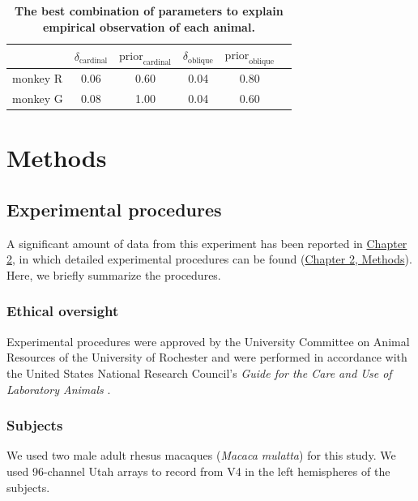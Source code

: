 \documentclass[lineno,pdflatex,sn-basic]{sn-jnl}%
\theoremstyle{thmstyleone}%
\theoremstyle{thmstyletwo}%
\theoremstyle{thmstylethree}%
\begin{document}
\begin{table}[h!]
    \centering
    \caption[The best combination of parameters to explain empirical observation of each animal.]{\textbf{The best combination of parameters to explain empirical observation of each animal.}}
    \begin{tabular}{lccccc}
        \toprule
        & $\delta_\textrm{cardinal}$ & 
        $\textrm{prior}_\textrm{cardinal}$ &
        $\delta_\textrm{oblique}$ & 
        $\textrm{prior}_\textrm{oblique}$
         \\
         \midrule
         monkey R & 0.06 & 0.60 & 0.04 & 0.80
         \\ 
         \midrule
         monkey G & 0.08 & 1.00 & 0.04 & 0.60 \\
         \bottomrule
    \end{tabular}
    \label{tbl:best_simulation_params}
\end{table}








\section{Methods}\label{sec11}

\subsection{Experimental procedures}
A significant amount of data from this experiment has been reported in \hyperref[sec_ch1:chapter_2]{Chapter 2}, in which detailed experimental procedures can be found (\hyperref[sec_ch1:Experiment procedures]{Chapter 2, Methods}). Here, we briefly summarize the procedures.
\subsubsection{Ethical oversight} 
Experimental procedures were approved by the University Committee on Animal Resources of the University of Rochester and were performed in accordance with the United States National Research Council’s \emph{Guide for the Care and Use of Laboratory Animals} \citep{guide}.
\subsubsection{Subjects}
We used two male adult rhesus macaques (\emph{Macaca mulatta}) for this study. We used 96-channel Utah arrays to record from V4 in the left hemispheres of the subjects.
\end{document}
